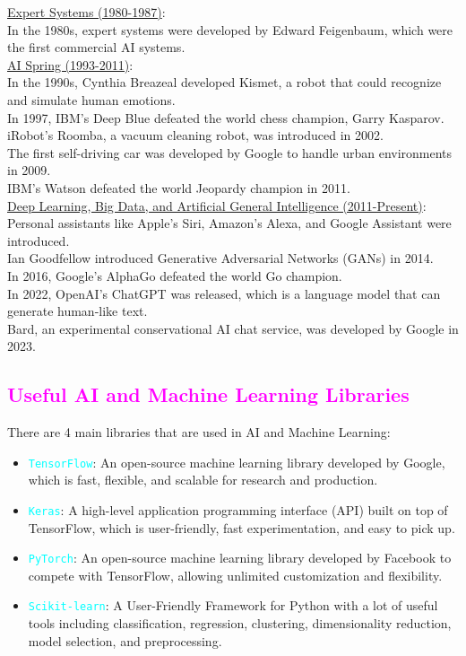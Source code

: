 \documentclass{book}
\begin{document}
\vspace{1mm}
\uline{Expert Systems (1980-1987)}: \\
\vspace{1mm}
In the 1980s, expert systems were developed by Edward Feigenbaum, which were the first commercial AI systems.\\
\vspace{1mm}
\uline{AI Spring (1993-2011)}: \\
\vspace{1mm}
In the 1990s, Cynthia Breazeal developed Kismet, a robot that could recognize and simulate human emotions.\\
In 1997, IBM's Deep Blue defeated the world chess champion, Garry Kasparov.\\
iRobot's Roomba, a vacuum cleaning robot, was introduced in 2002.\\
The first self-driving car was developed by Google to handle urban environments in 2009.\\
IBM's Watson defeated the world Jeopardy champion in 2011.\\
\vspace{1mm}
\uline{Deep Learning, Big Data, and Artificial General Intelligence (2011-Present)}: \\
\vspace{1mm}
Personal assistants like Apple's Siri, Amazon's Alexa, and Google Assistant were introduced.\\
Ian Goodfellow introduced Generative Adversarial Networks (GANs) in 2014.\\
In 2016, Google's AlphaGo defeated the world Go champion.\\
In 2022, OpenAI's ChatGPT was released, which is a language model that can generate human-like text.\\
Bard, an experimental conservational AI chat service, was developed by Google in 2023.\\
\newpage
\textcolor{magenta}{\section{\textbf{Useful AI and Machine Learning Libraries}}}
There are 4 main libraries that are used in AI and Machine Learning:
\begin{itemize}
    \item \textcolor{cyan}{\texttt{TensorFlow}}: An open-source machine learning library developed by Google, which is fast, flexible, and scalable for research and production.
    \item \textcolor{cyan}{\texttt{Keras}}: A high-level application programming interface (API) built on top of TensorFlow, which is user-friendly, fast experimentation, and easy to pick up.
    \item \textcolor{cyan}{\texttt{PyTorch}}: An open-source machine learning library developed by Facebook to compete with TensorFlow, allowing unlimited customization and flexibility.
    \item \textcolor{cyan}{\texttt{Scikit-learn}}: A User-Friendly Framework for Python with a lot of useful tools including classification, regression, clustering, dimensionality reduction, model selection, and preprocessing.
\end{itemize}
\end{document}

